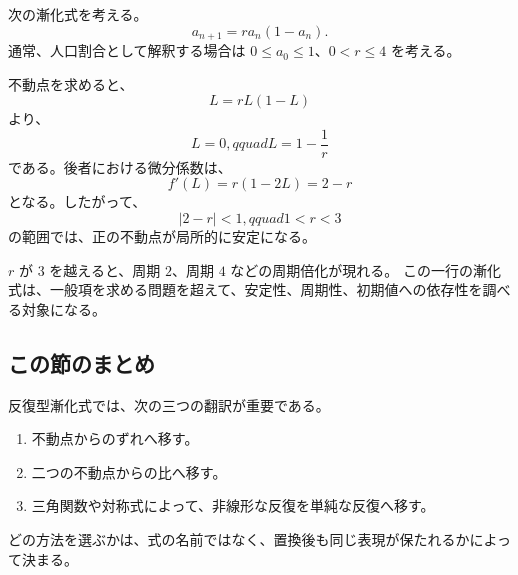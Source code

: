 次の漸化式を考える。
\[
  a_{n+1}=r a_n(1-a_n).
\]
通常、人口割合として解釈する場合は $0\leq a_0\leq1$、$0<r\leq4$ を考える。

不動点を求めると、
\[
  L=rL(1-L)
\]
より、
\[
  L=0,qquad L=1-\frac1r
\]
である。後者における微分係数は、
\[
  f'(L)=r(1-2L)=2-r
\]
となる。したがって、
\[
  |2-r|<1,qquad 1<r<3
\]
の範囲では、正の不動点が局所的に安定になる。

$r$ が $3$ を越えると、周期 $2$、周期 $4$ などの周期倍化が現れる。
この一行の漸化式は、一般項を求める問題を超えて、安定性、周期性、初期値への依存性を調べる対象になる。

\subsection*{この節のまとめ}

反復型漸化式では、次の三つの翻訳が重要である。

\begin{enumerate}
  \item 不動点からのずれへ移す。
  \item 二つの不動点からの比へ移す。
  \item 三角関数や対称式によって、非線形な反復を単純な反復へ移す。
\end{enumerate}

どの方法を選ぶかは、式の名前ではなく、置換後も同じ表現が保たれるかによって決まる。
